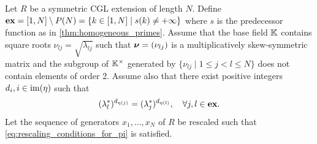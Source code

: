 \begin{theorem}\label{thm:gy_main_result}

	Let $R$ be a symmetric CGL extension of length $N$. Define $\mathbf{ex} = [1 ,N] \setminus P(N)
		= \{k \in [1, N] \mid s(k) \neq +\infty\}$ where $s$ is the predecessor function as in
	\cref{thm:homogeneous_primes}. Assume that the base field $\mathbb{K}$ contains square roots
	$\nu_{lj} = \sqrt{\lambda_{lj}}$ such that $\boldsymbol{\nu} = (\nu_{lj})$ is a multiplicatively
	skew-symmetric matrix and the subgroup of $\mathbb{K}^\times$ generated by $\{\nu_{lj} \mid 1
		\leq j < l \leq N\}$ does not contain elements of order 2. Assume also that there exist
	positive integers $d_i, i\in \operatorname{im}(\eta)$ such that
	\begin{equation*}
		(\lambda^*_l)^{d_{\eta(j)}} = (\lambda^*_j)^{d_{\eta(l)}}, \quad \forall j, l \in \mathbf{ex}.
	\end{equation*}
	Let the sequence of generators $x_1, \dots, x_N$ of $R$ be rescaled such that
	\cref{eq:rescaling_conditions_for_pi} is satisfied.


\end{theorem}

